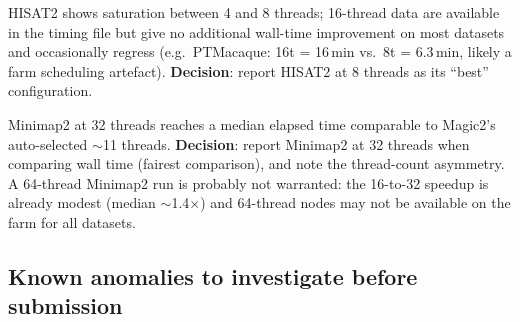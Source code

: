 \documentclass[11pt]{article}
\begin{document}
HISAT2 shows saturation between 4 and 8 threads; 16-thread data are
available in the timing file but give no additional wall-time
improvement on most datasets and occasionally regress (e.g.\
PTMacaque: 16t = 16\,min vs.\ 8t = 6.3\,min, likely a farm
scheduling artefact).
\textbf{Decision}: report HISAT2 at 8 threads as its ``best''
configuration.

Minimap2 at 32 threads reaches a median elapsed time comparable
to Magic2's auto-selected $\sim$11 threads.
\textbf{Decision}: report Minimap2 at 32 threads when comparing wall
time (fairest comparison), and note the thread-count asymmetry.
A 64-thread Minimap2 run is probably not warranted: the 16-to-32
speedup is already modest (median $\sim$1.4$\times$) and 64-thread
nodes may not be available on the farm for all datasets.

\subsection*{Known anomalies to investigate before submission}
\end{document}

